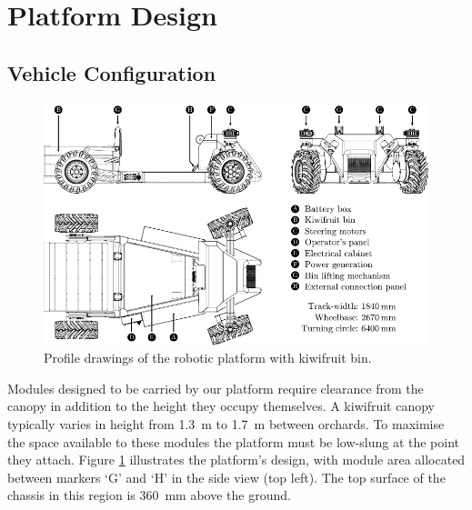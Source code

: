 \documentclass[preprint,authoryear,12pt]{elsarticle}
\begin{document}
\section{Platform Design}

    \subsection{Vehicle Configuration}
    \label{sect:mechanical}

        \begin{figure}[htb]
            \centering
            \includegraphics[width=\linewidth]{imgs/profile_views/AMMP-All-Labelled.pdf}
            \caption{Profile drawings of the robotic platform with kiwifruit bin.}
            \label{fig:AMMP}
        \end{figure}

        Modules designed to be carried by our platform require clearance from the canopy in addition to the height they occupy themselves.
        A kiwifruit canopy typically varies in height from \SI{1.3}{\meter} to \SI{1.7}{\meter} between orchards.
        To maximise the space available to these modules the platform must be low-slung at the point they attach.
        Figure \ref{fig:AMMP} illustrates the platform's design, with module area allocated between markers `G' and `H' in the side view (top left).
        The top surface of the chassis in this region is \SI{360}{\milli\meter} above the ground.
\end{document}
